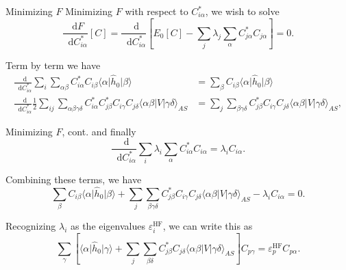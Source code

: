 \documentclass[UKenglish,aspectratio=169]{beamer}
\newcommand*\diff{\mathop{}\!\mathrm{d}}
\begin{document}
\begin{frame}{Minimizing $F$}
    Minimizing $F$ with respect to $C^*_{i\alpha}$, we wish to solve
    \begin{equation}
        \frac{\diff F}{\diff C^*_{i\alpha}}[C] = \frac{\diff}{\diff
        C_{i \alpha}^*} \left[ E_0[C] - \sum_j \lambda_j
        \sum_{\alpha} C_{j \alpha}^* C_{j \alpha} \right] = 0.
    \end{equation}

    Term by term we have
    \begin{align}
        \frac{\diff}{\diff C_{i \alpha}^*} \sum_{i}
        \sum_{\alpha\beta} C_{i \alpha}^* C_{i \beta}
        \langle \alpha \vert \hat{h}_0 \vert \beta \rangle
        &= \sum_{\beta} C_{i \beta}
        \langle \alpha \vert \hat{h}_0 \vert \beta \rangle \\
        \frac{\diff}{\diff C_{i \alpha}^*}
        \frac{1}{2} \sum_{ij} \sum_{\alpha\beta\gamma\delta} C_{i
        \alpha}^* C_{j \beta}^* C_{i \gamma} C_{j \delta}
        \langle \alpha\beta \vert V \vert \gamma\delta \rangle_{AS}
        &= \sum_j \sum_{\beta\gamma\delta} C_{j \beta}^* C_{i \gamma}
        C_{j \delta} \langle \alpha\beta \vert V \vert \gamma\delta
        \rangle_{AS},
    \end{align}
\end{frame}

\begin{frame}{Minimizing $F$, cont.}
    and finally
    \begin{equation}
        \frac{\diff}{\diff C_{i \alpha}^*} \sum_{i} \lambda_i
        \sum_{\alpha} C_{i \alpha}^* C_{i \alpha} = \lambda_i C_{i \alpha}.
    \end{equation}

    \bigskip

    Combining these terms, we have
    \begin{equation}
        \sum_{\beta} C_{i \beta}
        \langle \alpha \vert \hat{h}_0 \vert \beta \rangle
        + \sum_j \sum_{\beta\gamma\delta} C_{j \beta}^* C_{i \gamma}
        C_{j \delta} \langle \alpha\beta \vert V \vert \gamma\delta \rangle_{AS}
        - \lambda_i C_{i \alpha} = 0.
    \end{equation}

    Recognizing $\lambda_i$ as the eigenvalues
    $\varepsilon_i^\mathrm{HF}$, we can write this as
    \begin{equation}
        \sum_{\gamma} \left[
            \langle \alpha \vert \hat{h}_0 \vert \gamma \rangle
            + \sum_j \sum_{\beta\delta} C_{j \beta}^*  C_{j \delta}
            \langle \alpha\beta \vert V \vert \gamma\delta \rangle_{AS}
        \right] C_{p \gamma}
        = \varepsilon_p^\mathrm{HF} C_{p \alpha}.
    \end{equation}
\end{frame}
\end{document}
